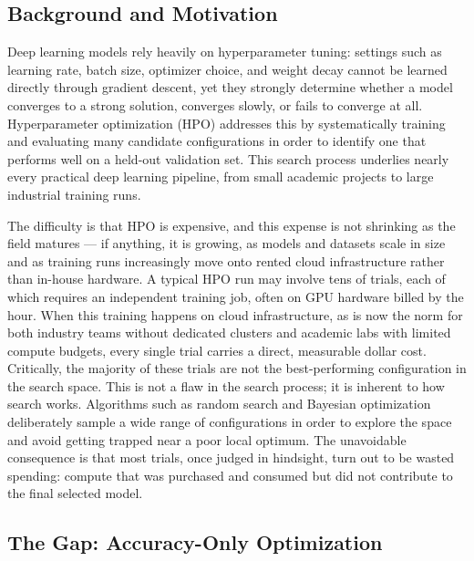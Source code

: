 \documentclass[11pt]{article}
\begin{document}
\subsection{Background and Motivation}

Deep learning models rely heavily on hyperparameter tuning: settings such as learning rate, batch size, optimizer choice, and weight decay cannot be learned directly through gradient descent, yet they strongly determine whether a model converges to a strong solution, converges slowly, or fails to converge at all. Hyperparameter optimization (HPO) addresses this by systematically training and evaluating many candidate configurations in order to identify one that performs well on a held-out validation set. This search process underlies nearly every practical deep learning pipeline, from small academic projects to large industrial training runs.

The difficulty is that HPO is expensive, and this expense is not shrinking as the field matures --- if anything, it is growing, as models and datasets scale in size and as training runs increasingly move onto rented cloud infrastructure rather than in-house hardware. A typical HPO run may involve tens of trials, each of which requires an independent training job, often on GPU hardware billed by the hour. When this training happens on cloud infrastructure, as is now the norm for both industry teams without dedicated clusters and academic labs with limited compute budgets, every single trial carries a direct, measurable dollar cost. Critically, the majority of these trials are not the best-performing configuration in the search space. This is not a flaw in the search process; it is inherent to how search works. Algorithms such as random search and Bayesian optimization deliberately sample a wide range of configurations in order to explore the space and avoid getting trapped near a poor local optimum. The unavoidable consequence is that most trials, once judged in hindsight, turn out to be wasted spending: compute that was purchased and consumed but did not contribute to the final selected model.

\subsection{The Gap: Accuracy-Only Optimization}
\end{document}
